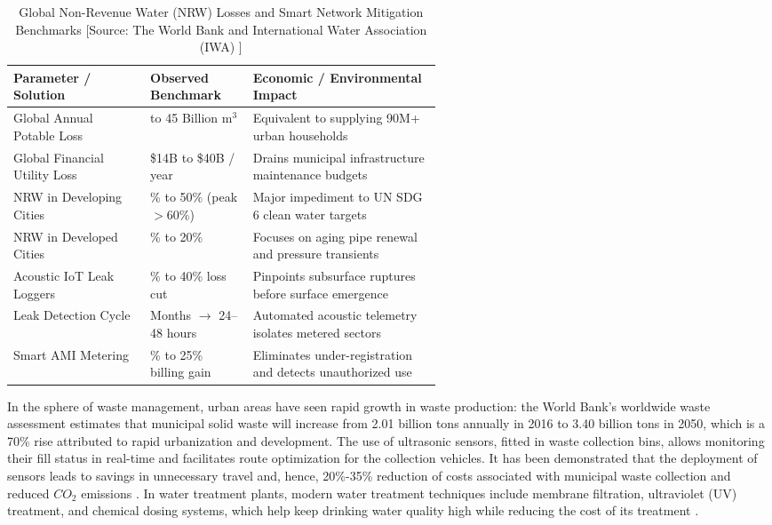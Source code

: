 \documentclass[pdflatex,sn-mathphys-num]{sn-jnl}%
\theoremstyle{thmstyleone}%
\theoremstyle{thmstyletwo}%
\theoremstyle{thmstylethree}%
\begin{document}
\begin{table}[!t]
\caption{Global Non-Revenue Water (NRW) Losses and Smart Network Mitigation Benchmarks [Source: The World Bank and International Water Association (IWA) \cite{r127}]}
\label{tab:nrw_benchmarks}
\centering
\scriptsize
\setlength{\tabcolsep}{3pt}
\renewcommand{\arraystretch}{1.2}
\renewcommand{\tabularxcolumn}[1]{m{#1}}
\begin{tabularx}{\linewidth}{|
>{\raggedright\arraybackslash}m{0.32\linewidth}|
>{\centering\arraybackslash}m{0.24\linewidth}|
>{\raggedright\arraybackslash}X|}
\hline
\textbf{Parameter / Solution} & \textbf{Observed Benchmark} & \textbf{Economic / Environmental Impact} \\
\hline
Global Annual Potable Loss & 32 to 45 Billion $\text{m}^3$ & Equivalent to supplying 90M+ urban households \\
\hline
Global Financial Utility Loss & \$14B to \$40B / year & Drains municipal infrastructure maintenance budgets \\
\hline
NRW in Developing Cities & 35\% to 50\% (peak $>$60\%) & Major impediment to UN SDG 6 clean water targets \\
\hline
NRW in Developed Cities & 15\% to 20\% & Focuses on aging pipe renewal and pressure transients \\
\hline
Acoustic IoT Leak Loggers & 20\% to 40\% loss cut & Pinpoints subsurface ruptures before surface emergence \\
\hline
Leak Detection Cycle & Months $\rightarrow$ 24--48 hours & Automated acoustic telemetry isolates metered sectors \\
\hline
Smart AMI Metering & 15\% to 25\% billing gain & Eliminates under-registration and detects unauthorized use \\
\hline
\end{tabularx}
\end{table}

In the sphere of waste management, urban areas have seen rapid growth in waste production: the World Bank's worldwide waste assessment estimates that municipal solid waste will increase from 2.01 billion tons annually in 2016 to 3.40 billion tons in 2050, which is a 70\% rise attributed to rapid urbanization and development. The use of ultrasonic sensors, fitted in waste collection bins, allows monitoring their fill status in real-time and facilitates route optimization for the collection vehicles. It has been demonstrated that the deployment of sensors leads to savings in unnecessary travel and, hence, 20\%-35\% reduction of costs associated with municipal waste collection and reduced $CO_2$ emissions \cite{r54,r57}. In water treatment plants, modern water treatment techniques include membrane filtration, ultraviolet (UV) treatment, and chemical dosing systems, which help keep drinking water quality high while reducing the cost of its treatment \cite{r55}.
\end{document}
